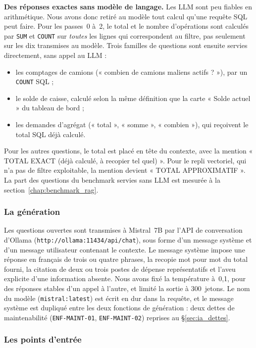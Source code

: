 \textbf{Des réponses exactes sans modèle de langage.} Les LLM sont peu fiables en arithmétique. Nous avons donc retiré au modèle tout calcul qu'une requête SQL peut faire. Pour les passes~0 à~2, le total et le nombre d'opérations sont calculés par \texttt{SUM} et \texttt{COUNT} sur \emph{toutes} les lignes qui correspondent au filtre, pas seulement sur les dix transmises au modèle. Trois familles de questions sont ensuite servies directement, sans appel au LLM :
\begin{itemize}
    \item les comptages de camions (« combien de camions maliens actifs ? »), par un \texttt{COUNT} SQL ;
    \item le solde de caisse, calculé selon la même définition que la carte « Solde actuel » du tableau de bord ;
    \item les demandes d'agrégat (« total », « somme », « combien »), qui reçoivent le total SQL déjà calculé.
\end{itemize}
Pour les autres questions, le total est placé en tête du contexte, avec la mention « TOTAL EXACT (déjà calculé, à recopier tel quel) ». Pour le repli vectoriel, qui n'a pas de filtre exploitable, la mention devient « TOTAL APPROXIMATIF ». La part des questions du benchmark servies sans LLM est mesurée à la section~\ref{chap:benchmark_rag}.

\subsubsection{La génération}

Les questions ouvertes sont transmises à Mistral~7B par l'API de conversation d'Ollama (\texttt{http://ollama:11434/api/chat}), sous forme d'un message système et d'un message utilisateur contenant le contexte. Le message système impose une réponse en français de trois ou quatre phrases, la recopie mot pour mot du total fourni, la citation de deux ou trois postes de dépense représentatifs et l'aveu explicite d'une information absente. Nous avons fixé la température à~0,1, pour des réponses stables d'un appel à l'autre, et limité la sortie à 300~jetons. Le nom du modèle (\texttt{mistral:latest}) est écrit en dur dans la requête, et le message système est dupliqué entre les deux fonctions de génération : deux dettes de maintenabilité (\texttt{ENF-MAINT-01}, \texttt{ENF-MAINT-02}) reprises au §\ref{sec:ia_dettes}.

\subsubsection{Les points d'entrée}

